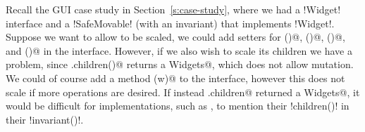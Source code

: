 Recall the GUI case study in Section~\ref{s:case-study}, where we had a \Q!Widget! interface and a \Q!SafeMovable! (with an invariant) that implements \Q!Widget!.
Suppose we want to allow \Q@Widget@s to be scaled, we could add \Q@mut@ setters for \Q@width()@, \Q@height()@, \Q@left()@, and \Q@top()@ in the \Q@Widget@ interface. However, if we also wish to scale its children we have a problem, since \Q@Widget.children()@ returns a \Q@read Widgets@, which does not allow mutation. We could of course add a \Q@mut@ method \Q@zoom(w)@ to the \Q@Widget@ interface, however this does not scale if more operations are desired. If instead \Q@Widget.children@ returned a \Q@mut Widgets@, it would be difficult for \Q@Widget@ implementations, such as \Q@SafeMovable@, 
to mention their \Q!children()! in their \Q!invariant()!.


